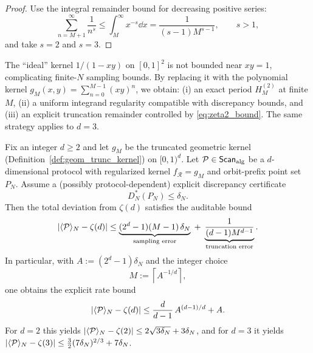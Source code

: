 \begin{proof}
Use the integral remainder bound for decreasing positive series:
\[
\sum_{n=M+1}^\infty \frac{1}{n^s}
\le \int_M^\infty x^{-s}\dd x
=\frac{1}{(s-1)M^{s-1}},\qquad s>1,
\]
and take $s=2$ and $s=3$.
\end{proof}

\begin{remark}
\label{rem:why_truncation}
The ``ideal'' kernel $1/(1-xy)$ on $[0,1]^2$ is not bounded near $xy=1$, complicating finite-$N$ sampling bounds. By replacing it with the polynomial kernel $g_M(x,y)=\sum_{n=0}^{M-1}(xy)^n$, we obtain: (i) an exact period $H_M^{(2)}$ at finite $M$, (ii) a uniform integrand regularity compatible with discrepancy bounds, and (iii) an explicit truncation remainder controlled by \eqref{eq:zeta2_bound}. The same strategy applies to $d=3$.
\end{remark}

\begin{corollary}
\label{cor:optimal_truncation_tradeoff}
Fix an integer $d\ge 2$ and let $g_M$ be the truncated geometric kernel (Definition~\ref{def:geom_trunc_kernel}) on $[0,1)^d$. Let $\mathcal{P}\in\mathsf{Scan}_{\mathrm{alg}}$ be a $d$-dimensional protocol with regularized kernel $f_{\mathcal{R}}=g_M$ and orbit-prefix point set $P_N$. Assume a (possibly protocol-dependent) explicit discrepancy certificate
\[
D_N^\ast(P_N)\le \delta_N.
\]
Then the total deviation from $\zeta(d)$ satisfies the auditable bound
\begin{equation}
\label{eq:zeta_d_tradeoff}
\left|\langle \mathcal{P} \rangle_N-\zeta(d)\right|
\le
\underbrace{(2^d-1)(M-1)\,\delta_N}_{\text{sampling error}}
\;+\;
\underbrace{\frac{1}{(d-1)M^{d-1}}}_{\text{truncation error}}.
\end{equation}
In particular, with $A:=(2^d-1)\delta_N$ and the integer choice
\begin{equation}
\label{eq:optimal_m_choice}
M:=\left\lceil A^{-1/d}\right\rceil,
\end{equation}
one obtains the explicit rate bound
\begin{equation}
\label{eq:optimized_zeta_d_bound}
\left|\langle \mathcal{P} \rangle_N-\zeta(d)\right|
\le
\frac{d}{d-1}\,A^{(d-1)/d}+A.
\end{equation}
For $d=2$ this yields $|\langle \mathcal{P} \rangle_N-\zeta(2)|\le 2\sqrt{3\delta_N}+3\delta_N$, and for $d=3$ it yields $|\langle \mathcal{P} \rangle_N-\zeta(3)|\le \tfrac{3}{2}(7\delta_N)^{2/3}+7\delta_N$.
\end{corollary}

